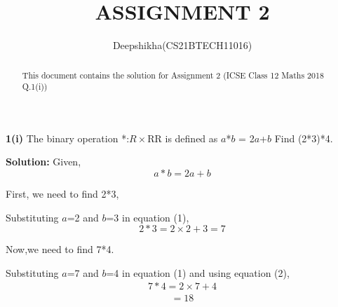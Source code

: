 \documentclass[journal, 12pt, twocolumn]{IEEEtran}
\begin{document}
\title{ASSIGNMENT 2}
\author{Deepshikha(CS21BTECH11016)}
\maketitle

\begin{abstract}
This document contains the solution for Assignment 2 (ICSE Class 12 Maths 2018 Q.1(i))
\end{abstract}

\textbf{1(i)}
The binary operation *:$R\times$R\textrightarrow R is defined as $a$*$b$ = 2$a$+$b$ Find (2*3)*4.


\textbf{Solution:}
Given,
\begin{equation}
     a*b=2a+b\label{eq:1}
\end{equation}

First, we need to find 2*3,


Substituting $a$=2 and $b$=3 in equation (1),
\begin{equation}
    2*3=2\times2+3=7\label{eq:2}
\end{equation}

Now,we need to find 7*4.


Substituting $a$=7 and $b$=4 in equation (1) and using equation (2),
\begin{align*}
    7*4=2\times7+4
\end{align*}
\begin{align*}
      =18
\end{align*}
\end{document}
